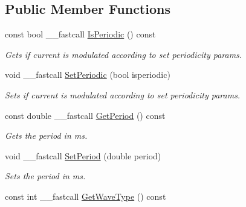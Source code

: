 \subsection*{Public Member Functions}
\begin{DoxyCompactItemize}
\item 
\hypertarget{class_t_current_adca3b88eb3a366b9beb2c7e1bc128b5e}{const bool \+\_\+\+\_\+fastcall \hyperlink{class_t_current_adca3b88eb3a366b9beb2c7e1bc128b5e}{Is\+Periodic} () const }\label{class_t_current_adca3b88eb3a366b9beb2c7e1bc128b5e}

\begin{DoxyCompactList}\small\item\em Gets if current is modulated according to set periodicity params. \end{DoxyCompactList}\item 
\hypertarget{class_t_current_ac7bd1741a0d5048d7e4cd3bae0a15c59}{void \+\_\+\+\_\+fastcall \hyperlink{class_t_current_ac7bd1741a0d5048d7e4cd3bae0a15c59}{Set\+Periodic} (bool isperiodic)}\label{class_t_current_ac7bd1741a0d5048d7e4cd3bae0a15c59}

\begin{DoxyCompactList}\small\item\em Sets if current is modulated according to set periodicity params. \end{DoxyCompactList}\item 
\hypertarget{class_t_current_ad5c709fa160f92c4e277d762861041df}{const double \+\_\+\+\_\+fastcall \hyperlink{class_t_current_ad5c709fa160f92c4e277d762861041df}{Get\+Period} () const }\label{class_t_current_ad5c709fa160f92c4e277d762861041df}

\begin{DoxyCompactList}\small\item\em Gets the period in ms. \end{DoxyCompactList}\item 
\hypertarget{class_t_current_a2945ddc6bc5adf79ce91f89d65d35c6f}{void \+\_\+\+\_\+fastcall \hyperlink{class_t_current_a2945ddc6bc5adf79ce91f89d65d35c6f}{Set\+Period} (double period)}\label{class_t_current_a2945ddc6bc5adf79ce91f89d65d35c6f}

\begin{DoxyCompactList}\small\item\em Sets the period in ms. \end{DoxyCompactList}\item 
\hypertarget{class_t_current_a43746954efbc4bd1c72002aafe2bb07e}{const int \+\_\+\+\_\+fastcall \hyperlink{class_t_current_a43746954efbc4bd1c72002aafe2bb07e}{Get\+Wave\+Type} () const }\label{class_t_current_a43746954efbc4bd1c72002aafe2bb07e}


\end{DoxyCompactItemize}
